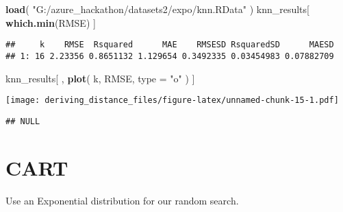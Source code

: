 \documentclass[]{article}
\newenvironment{Shaded}{\begin{snugshade}}{\end{snugshade}}
\newcommand{\DataTypeTok}[1]{\textcolor[rgb]{0.13,0.29,0.53}{#1}}
\newcommand{\DecValTok}[1]{\textcolor[rgb]{0.00,0.00,0.81}{#1}}
\newcommand{\FloatTok}[1]{\textcolor[rgb]{0.00,0.00,0.81}{#1}}
\newcommand{\KeywordTok}[1]{\textcolor[rgb]{0.13,0.29,0.53}{\textbf{#1}}}
\newcommand{\NormalTok}[1]{#1}
\newcommand{\OperatorTok}[1]{\textcolor[rgb]{0.81,0.36,0.00}{\textbf{#1}}}
\newcommand{\StringTok}[1]{\textcolor[rgb]{0.31,0.60,0.02}{#1}}
\begin{document}
\begin{Shaded}
\begin{Highlighting}[]
\KeywordTok{load}\NormalTok{( }\StringTok{"G:/azure_hackathon/datasets2/expo/knn.RData"}\NormalTok{ )}
\NormalTok{knn_results[ }\KeywordTok{which.min}\NormalTok{(RMSE) ]}
\end{Highlighting}
\end{Shaded}

\begin{verbatim}
##     k    RMSE  Rsquared      MAE    RMSESD RsquaredSD      MAESD
## 1: 16 2.23356 0.8651132 1.129654 0.3492335 0.03454983 0.07882709
\end{verbatim}

\begin{Shaded}
\begin{Highlighting}[]
\NormalTok{knn_results[ , }\KeywordTok{plot}\NormalTok{( k, RMSE, }\DataTypeTok{type =} \StringTok{"o"}\NormalTok{ ) ]}
\end{Highlighting}
\end{Shaded}

\texttt{[image: deriving\_distance\_files/figure-latex/unnamed-chunk-15-1.pdf]}

\begin{verbatim}
## NULL
\end{verbatim}

\hypertarget{cart}{%
\section{CART}\label{cart}}

Use an Exponential distribution for our random search.

\begin{Shaded}
\end{Shaded}
\end{document}
